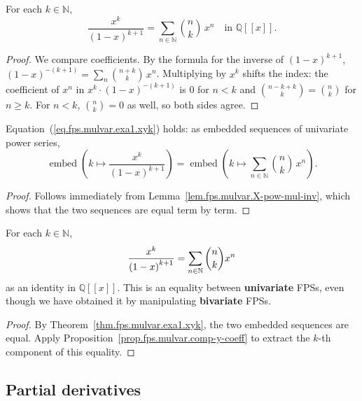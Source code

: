 \begin{lemma}
\label{lem.fps.mulvar.X-pow-mul-inv}
\leanhelper
\leanok
For each $k \in \mathbb{N}$,
\[
\frac{x^k}{(1-x)^{k+1}} = \sum_{n \in \mathbb{N}} \binom{n}{k}\, x^n
\quad \text{in } \mathbb{Q}[[x]].
\]
\end{lemma}

\begin{proof}
We compare coefficients. By the formula for the inverse of $(1-x)^{k+1}$,
$(1-x)^{-(k+1)} = \sum_n \binom{n+k}{k}\, x^n$.
Multiplying by $x^k$ shifts the index: the coefficient of $x^n$ in
$x^k \cdot (1-x)^{-(k+1)}$ is $0$ for $n < k$ and $\binom{n-k+k}{k} = \binom{n}{k}$
for $n \geq k$. For $n < k$, $\binom{n}{k} = 0$ as well, so both sides agree.
\end{proof}

\begin{theorem}
\label{thm.fps.mulvar.exa1.xyk}
\leanhelper
\leanok
Equation~(\ref{eq.fps.mulvar.exa1.xyk}) holds: as embedded sequences of
univariate power series,
\[
\operatorname{embed}\!\left(k \mapsto \frac{x^k}{(1-x)^{k+1}}\right)
= \operatorname{embed}\!\left(k \mapsto \sum_{n \in \mathbb{N}} \binom{n}{k}\, x^n\right).
\]
\end{theorem}

\begin{proof}
Follows immediately from Lemma~\ref{lem.fps.mulvar.X-pow-mul-inv}, which
shows that the two sequences are equal term by term.
\end{proof}

\begin{theorem}
\label{thm.fps.mulvar.exa1.res1}
\leanhelper
\leanok
For each $k \in \mathbb{N}$,
\[
\dfrac{x^{k}}{\left(  1-x\right)  ^{k+1}}=\sum_{n\in\mathbb{N}}\dbinom{n}%
{k}x^{n}
\]
as an identity in $\mathbb{Q}[[x]]$.
This is an equality between \textbf{univariate} FPSs, even though we have
obtained it by manipulating \textbf{bivariate} FPSs.
\end{theorem}

\begin{proof}
By Theorem~\ref{thm.fps.mulvar.exa1.xyk}, the two embedded sequences are
equal. Apply Proposition~\ref{prop.fps.mulvar.comp-y-coeff}
to extract the $k$-th component of
this equality.
\end{proof}

\subsection{Partial derivatives}

